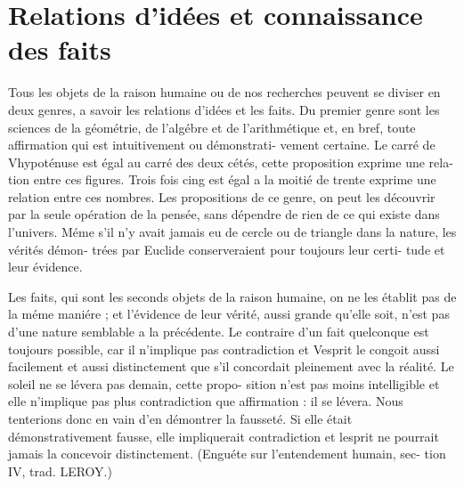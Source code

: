 
\section{Relations d'idées et connaissance des faits}

Tous les objets de la raison humaine ou de nos recherches
peuvent se diviser en deux genres, a savoir les relations
d’idées et les faits. Du premier genre sont les sciences de
la géométrie, de l’algébre et de l’arithmétique et, en bref,
toute affirmation qui est intuitivement ou démonstrati-
vement certaine. Le carré de Vhypoténuse est égal au
carré des deux cétés, cette proposition exprime une rela-
tion entre ces figures. Trois fois cing est égal a la moitié
de trente exprime une relation entre ces nombres. Les
propositions de ce genre, on peut les découvrir par la
seule opération de la pensée, sans dépendre de rien de ce
qui existe dans l’univers. Méme s’il n’y avait jamais eu
de cercle ou de triangle dans la nature, les vérités démon-
trées par Euclide conserveraient pour toujours leur certi-
tude et leur évidence.

Les faits, qui sont les seconds objets de la raison humaine,
on ne les établit pas de la méme maniére ; et l’évidence de
leur vérité, aussi grande qu’elle soit, n’est pas d’une
nature semblable a la précédente. Le contraire d’un fait
quelconque est toujours possible, car il n’implique pas
contradiction et Vesprit le congoit aussi facilement et
aussi distinctement que s’il concordait pleinement avec
la réalité. Le soleil ne se lévera pas demain, cette propo-
sition n’est pas moins intelligible et elle n’implique pas
plus contradiction que affirmation : il se lévera. Nous
tenterions donc en vain d’en démontrer la fausseté. Si
elle était démonstrativement fausse, elle impliquerait
contradiction et lesprit ne pourrait jamais la concevoir
distinctement. (Enguéte sur l’entendement humain, sec-
tion IV, trad. L{\footnotesize EROY}.)

